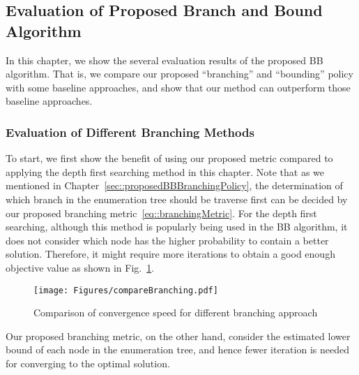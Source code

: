 \subsection{Evaluation of Proposed Branch and Bound Algorithm}
In this chapter, we show the several evaluation results of the proposed BB algorithm.
That is, we compare our proposed ``branching'' and ``bounding'' policy with some baseline approaches, and show that our method can outperform those baseline approaches.

\subsubsection{Evaluation of Different Branching Methods}
To start, we first show the benefit of using our proposed metric compared to applying the depth first searching method in this chapter.
Note that as we mentioned in Chapter~\ref{sec::proposedBBBranchingPolicy}, the determination of which branch in the enumeration tree should be traverse first can be decided by our proposed branching metric~\eqref{eq::branchingMetric}.
For the depth first searching, although this method is popularly being used in the BB algorithm, it does not consider which node has the higher probability to contain a better solution.
Therefore, it might require more iterations to obtain a good enough objective value as shown in Fig.~\ref{fig::compareBranching}.
%
\begin{figure}
\begin{center}
\texttt{[image: Figures/compareBranching.pdf]}
\caption{\label{fig::compareBranching} Comparison of convergence speed for different branching approach}
\end{center}
\end{figure}
%
Our proposed branching metric, on the other hand, consider the estimated lower bound of each node in the enumeration tree, and hence fewer iteration is needed for converging to the optimal solution.


